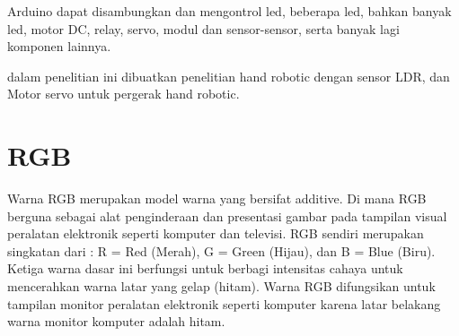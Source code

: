 Arduino dapat disambungkan dan mengontrol led, beberapa led, bahkan banyak led, motor DC, relay, servo, modul dan sensor-sensor, serta banyak lagi komponen lainnya.
 
dalam penelitian ini dibuatkan penelitian hand robotic dengan sensor LDR, dan Motor servo untuk pergerak hand robotic.

\section{RGB }
Warna RGB merupakan  model warna yang bersifat additive. Di mana RGB berguna sebagai  alat penginderaan dan presentasi gambar pada tampilan visual peralatan elektronik seperti komputer dan televisi. RGB sendiri merupakan singkatan dari : R = Red (Merah), G = Green (Hijau), dan B = Blue (Biru). Ketiga warna dasar ini berfungsi untuk berbagi intensitas cahaya untuk mencerahkan warna latar yang gelap (hitam).  Warna RGB difungsikan untuk tampilan monitor peralatan elektronik seperti komputer karena latar belakang warna monitor komputer adalah hitam.
 